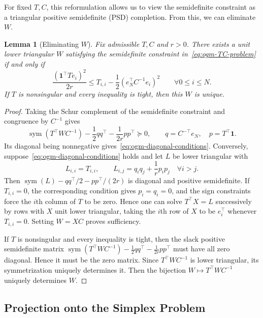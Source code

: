 \documentclass[11pt]{article}
\newtheorem{lemma}[thm]{Lemma}
\begin{document}
For fixed $T,C$, this reformulation allows us to view the semidefinite constraint as a triangular positive semidefinite (PSD) completion. From this, we can eliminate $W$.

\begin{lemma}[Eliminating $W$]\label{lem:ogm-eliminate-W}
Fix admissible $T,C$ and $r>0$. There exists a unit lower triangular $W$
satisfying the semidefinite constraint in~\eqref{eq:ogm-TC-problem} if and
only if
\begin{equation}\label{eq:ogm-diagonal-conditions}
\frac{(\mathbf 1^\top Te_i)^2}{2r}
\leq
T_{i,i}-\frac12(e_N^\top C^{-1}e_i)^2
\qquad \forall 0\leq i\leq N.
\end{equation}
If $T$ is nonsingular and every inequality is tight, then this $W$ is unique.
\end{lemma}

\begin{proof}
Taking the Schur complement of the semidefinite constraint and congruence by $C^{-1}$ gives
\[
 \operatorname{sym}(T^\top WC^{-1})
 -\frac12qq^\top-\frac1{2r}pp^\top\succeq0,
 \qquad q=C^{-\top}e_N,\quad p=T^\top\mathbf1.
\]
Its diagonal being nonnegative gives~\eqref{eq:ogm-diagonal-conditions}.
Conversely, suppose~\eqref{eq:ogm-diagonal-conditions} holds and let $L$ be
lower triangular with
\[
 L_{i,i}=T_{i,i},
 \qquad
 L_{i,j}=q_iq_j+\frac1r p_ip_j
 \quad \forall i>j.
\]
Then $\operatorname{sym}(L)-qq^\top/2-pp^\top/(2r)$ is diagonal and positive
semidefinite. If $T_{i,i}=0$, the corresponding condition gives $p_i=q_i=0$,
and the sign constraints force the $i$th column of $T$ to be zero. Hence one
can solve $T^\top X=L$ successively by rows with $X$ unit lower triangular,
taking the $i$th row of $X$ to be $e_i^\top$ whenever $T_{i,i}=0$. Setting
$W=XC$ proves
sufficiency.

If $T$ is nonsingular and every inequality is tight, then the slack positive semidefinite matrix $\operatorname{sym}(T^\top WC^{-1})
-\frac12qq^\top-\frac1{2r}pp^\top$ must have all zero diagonal. Hence it must be the zero matrix. Since $T^\top WC^{-1}$ is lower triangular, its symmetrization uniquely determines it. Then the bijection $W\mapsto T^\top WC^{-1}$ uniquely determines $W$.
\end{proof}



\subsection{Projection onto the Simplex Problem}
\end{document}
